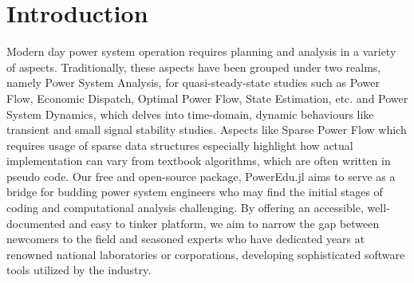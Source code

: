 \documentclass[varwidth]{standalone}
\providecommand{\packageName}[1]{PowerEdu.jl}
\begin{document}
    \section{Introduction}
    Modern day power system operation requires planning and analysis in a variety
    of aspects. Traditionally, these aspects have been grouped under two realms,
    namely Power System Analysis, for quasi-steady-state studies
    such as Power Flow, Economic Dispatch, Optimal Power Flow, State Estimation, etc.
    and Power System Dynamics, which delves into time-domain, dynamic behaviours
    like transient and small signal stability studies. Aspects like Sparse Power
    Flow which requires usage of sparse data
    structures especially highlight how actual implementation can vary from
    textbook algorithms, which are often written in pseudo code.
    Our free and open-source package, \packageName{} aims to serve as a bridge for budding power system engineers who
    may find the initial stages of coding and computational analysis challenging.
    By offering an accessible, well-documented and easy to tinker platform, we
    aim to narrow the gap between newcomers to the field and seasoned experts
    who have dedicated years at renowned national laboratories or corporations,
    developing sophisticated software tools utilized
    by the industry.
\end{document}
